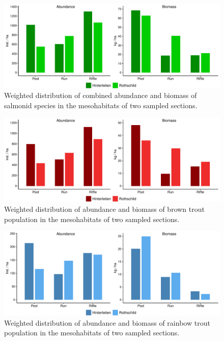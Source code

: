 \begin{figure}[!htb]                              %
	\center
	\includegraphics[width=.9\textwidth]{images/all_species.pdf}                %
	\caption{Weighted distribution of combined abundance and biomass of salmonid species in the mesohabitats of two sampled sections.}        %
	\label{fig:AB_all_species}                                                       %
\end{figure}

\begin{figure}[!htb]                              %
	\center
	\includegraphics[width=.9\textwidth]{images/brown_trout.pdf}                %
	\caption{Weighted distribution of abundance and biomass of brown trout population in the mesohabitats of two sampled sections.}        %
	\label{fig:AB_brown}                                                       %
\end{figure}

\begin{figure}[!htb]                              %
	\center
	\includegraphics[width=.9\textwidth]{images/rainbow_trout.pdf}                %
	\caption{Weighted distribution of abundance and biomass of rainbow trout population in the mesohabitats of two sampled sections.}        %
	\label{fig:AB_rainbow}                                                       %
\end{figure}

